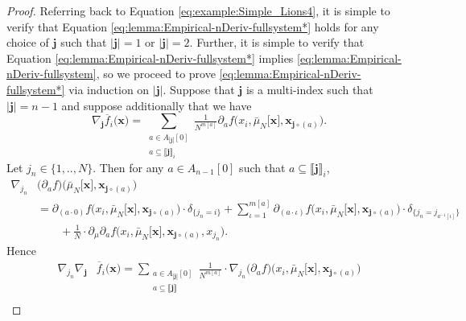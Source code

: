 \documentclass[a4paper,11pt,twoside]{article}
\numberwithin{equation}{section}
\theoremstyle{plain}
\newcommand{\1}{\mathbbm{1}}
\begin{document}
	\begin{proof}
		Referring back to Equation \eqref{eq:example:Simple_Lions4}, it is simple to verify that Equation \eqref{eq:lemma:Empirical-nDeriv-fullsystem*} holds for any choice of $\boldsymbol{j}$ such that $|\boldsymbol{j}| = 1$ or $|\boldsymbol{j}| = 2$. Further, it is simple to verify that Equation \eqref{eq:lemma:Empirical-nDeriv-fullsystem*} implies \eqref{eq:lemma:Empirical-nDeriv-fullsystem}, so we proceed to prove \eqref{eq:lemma:Empirical-nDeriv-fullsystem*} via induction on $|\boldsymbol{j}|$. Suppose that $\boldsymbol{j}$ is a multi-index such that $|\boldsymbol{j}|=n-1$ and suppose additionally that we have
		\begin{equation*}
			\nabla_{\boldsymbol{j}} \overline{f}_i \Big( \boldsymbol{x} \Big) 
			= 
			\sum_{\substack{a \in A_{|\boldsymbol{j}|}[0] \\ a\subseteq \llbracket \boldsymbol{j}\rrbracket_i }} \tfrac{1}{N^{m[a]}} \partial_a f \Big( x_i, \bar{\mu}_N\big[ \boldsymbol{x} \big], \boldsymbol{x}_{\boldsymbol{j}\circ(a)} \Big). 
		\end{equation*}
		Let $j_n\in \{1, .., N\}$. Then for any $a\in A_{n-1}[0]$ such that $a\subseteq \llbracket \boldsymbol{j}\rrbracket_i$, 
		\begin{align*}
			\nabla_{j_n}& \big( \partial_a f\big) \Big( \bar{\mu}_N\big[ \boldsymbol{x} \big], \boldsymbol{x}_{\boldsymbol{j}\circ(a)} \Big) 
			\\
			&= \partial_{(a\cdot 0)} f\Big( x_i, \bar{\mu}_N\big[ \boldsymbol{x} \big], \boldsymbol{x}_{\boldsymbol{j}\circ(a)} \Big) \cdot \delta_{\{ j_n = i\}}
			+
			\sum_{\iota = 1}^{m[a]} \partial_{(a\cdot \iota)} f\Big( x_i, \bar{\mu}_N\big[ \boldsymbol{x} \big], \boldsymbol{x}_{\boldsymbol{j}\circ(a)} \Big) \cdot \delta_{\{ j_n = j_{a^{-1}[\iota]} \}} 
			\\
			&\qquad + 
			\tfrac{1}{N} \cdot \partial_\mu \partial_a f\Big( x_i, \bar{\mu}_N\big[ \boldsymbol{x} \big], \boldsymbol{x}_{\boldsymbol{j}\circ(a)}, x_{j_n} \Big). 
		\end{align*}
		Hence
		\begin{align*}
			\nabla_{j_n} \nabla_{\boldsymbol{j}} &\overline{f}_i\Big( \boldsymbol{x} \Big) = \sum_{\substack{a \in A_{|\boldsymbol{j}|}[0] \\ a \subseteq \llbracket \boldsymbol{j} \rrbracket}} \tfrac{1}{N^{m[a]}} \cdot \nabla_{j_n} \big( \partial_a f \big) \Big( x_i, \bar{\mu}_N\big[ \boldsymbol{x} \big], \boldsymbol{x}_{\boldsymbol{j}\circ(a)} \Big)
			\\

\end{align*}
\end{proof}
\end{document}
